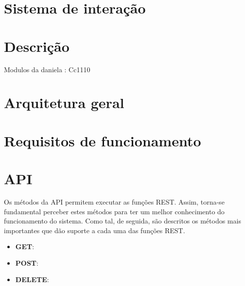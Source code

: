 \section{Sistema de interação}


\section{Descrição}


Modulos da daniela : Cc1110



\section{Arquitetura geral}




\newpage









\section{Requisitos de funcionamento}


\newpage


\section{API}

Os métodos da API permitem executar as funções REST. Assim, torna-se fundamental perceber estes métodos para ter um melhor conhecimento do funcionamento do sistema. Como tal, de seguida, são descritos os métodos mais importantes que dão suporte a cada uma das funções REST.

\begin{itemize}
	\item \textbf{GET}: 
	\item \textbf{POST}: 
	\item \textbf{DELETE}: 
\end{itemize}





